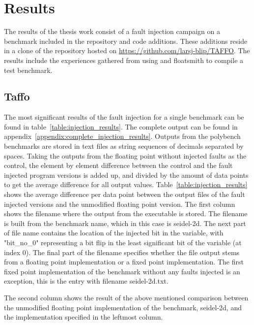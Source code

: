 \section{Results}

The results of the thesis work consist of a fault injection campaign on a benchmark included in the \taffo{} repository and code additions. These additions reside in a clone of the \taffo{} repository hosted on \href{https://github.com/larsj-blip/TAFFO}{https://github.com/larsj-blip/TAFFO}. The results include the experiences gathered from using \taffo{} and floatsmith to compile a test benchmark.


\subsection{Taffo}
The most significant results of the fault injection for a single benchmark can be found in table~\ref{table:injection_results}. The complete output can be found in appendix~\ref{appendix:complete_injection_results}. Outputs from the polybench benchmarks are stored in text files as string sequences of decimals separated by spaces. Taking the outputs from the floating point without injected faults as the control, the element by element difference between the control and the fault injected program versions is added up, and divided by the amount of data points to get the average difference for all output values. Table~\ref{table:injection_results} shows the average difference per data point between the output files of the fault injected versions and the unmodified floating point version.   
The first column shows the filename where the output from the executable is stored. The filename is built from the benchmark name, which in this case is seidel-2d. The next part of file name contains the location of the injected bit in the variable, with "bit\_no\_0" representing a bit flip in the least significant bit of the variable (at index 0). The final part of the filename specifies whether the file output stems from a floating point implementation or a fixed point implementation.
The first fixed point implementation of the benchmark without any faults injected is an exception, this is the entry with filename seidel-2d.txt.

The second column shows the result of the above mentioned comparison between the unmodified floating point implementation of the benchmark, seidel-2d, and the implementation specified in the leftmost column. 


